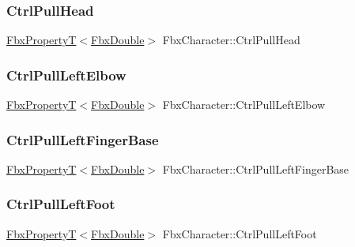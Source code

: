 \subsubsection{\texorpdfstring{Ctrl\+Pull\+Head}{CtrlPullHead}}
{\footnotesize\ttfamily \hyperlink{class_fbx_property_t}{Fbx\+PropertyT}$<$\hyperlink{fbxtypes_8h_a171e72a1c46fc15c1a6c9c31948c1c5b}{Fbx\+Double}$>$ Fbx\+Character\+::\+Ctrl\+Pull\+Head}

\mbox{\label{class_fbx_character_a92f7ba20e81f5bbe5ea18bb2476a2daf}} 
\subsubsection{\texorpdfstring{Ctrl\+Pull\+Left\+Elbow}{CtrlPullLeftElbow}}
{\footnotesize\ttfamily \hyperlink{class_fbx_property_t}{Fbx\+PropertyT}$<$\hyperlink{fbxtypes_8h_a171e72a1c46fc15c1a6c9c31948c1c5b}{Fbx\+Double}$>$ Fbx\+Character\+::\+Ctrl\+Pull\+Left\+Elbow}

\mbox{\label{class_fbx_character_af2b72f5ec76ccfca0a59cba911ee42cd}} 
\subsubsection{\texorpdfstring{Ctrl\+Pull\+Left\+Finger\+Base}{CtrlPullLeftFingerBase}}
{\footnotesize\ttfamily \hyperlink{class_fbx_property_t}{Fbx\+PropertyT}$<$\hyperlink{fbxtypes_8h_a171e72a1c46fc15c1a6c9c31948c1c5b}{Fbx\+Double}$>$ Fbx\+Character\+::\+Ctrl\+Pull\+Left\+Finger\+Base}

\mbox{\label{class_fbx_character_a9db7ae7ce8136715096e1e561340a90f}} 
\subsubsection{\texorpdfstring{Ctrl\+Pull\+Left\+Foot}{CtrlPullLeftFoot}}
{\footnotesize\ttfamily \hyperlink{class_fbx_property_t}{Fbx\+PropertyT}$<$\hyperlink{fbxtypes_8h_a171e72a1c46fc15c1a6c9c31948c1c5b}{Fbx\+Double}$>$ Fbx\+Character\+::\+Ctrl\+Pull\+Left\+Foot}

